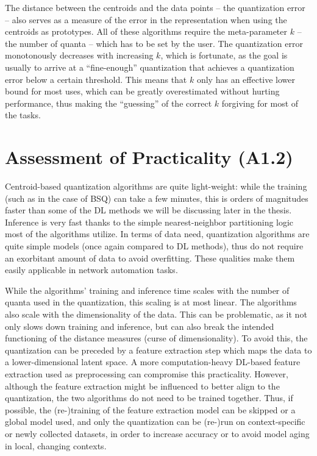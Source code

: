 		The distance between the centroids and the data points -- the quantization error -- also serves as a measure of the error in the representation when using the centroids as prototypes.
		All of these algorithms require the meta-parameter $k$ -- the number of quanta -- which has to be set by the user.
		The quantization error monotonously decreases with increasing $k$, which is fortunate, as the goal is usually to arrive at a ``fine-enough'' quantization that achieves a quantization error below a certain threshold.
		This means that $k$ only has an effective lower bound for most uses, which can be greatly overestimated without hurting performance, thus making the ``guessing'' of the correct $k$ forgiving for most of the tasks.
		
	\section{Assessment of Practicality (A1.2)}
		
		Centroid-based quantization algorithms are quite light-weight: while the training (such as in the case of \ac{BSQ}) can take a few minutes, this is orders of magnitudes faster than some of the \ac{DL} methods we will be discussing later in the thesis.
		Inference is very fast thanks to the simple nearest-neighbor partitioning logic most of the algorithms utilize.
		In terms of data need, quantization algorithms are quite simple models (once again compared to \ac{DL} methods), thus do not require an exorbitant amount of data to avoid overfitting.
		These qualities make them easily applicable in network automation tasks.
		
		While the algorithms' training and inference time scales with the number of quanta used in the quantization, this scaling is at most linear.		
		The algorithms also scale with the dimensionality of the data.
		This can be problematic, as it not only slows down training and inference, but can also break the intended functioning of the distance measures (curse of dimensionality).
		To avoid this, the quantization can be preceded by a feature extraction step which maps the data to a lower-dimensional latent space.
		A more computation-heavy \ac{DL}-based feature extraction used as preprocessing can compromise this practicality.
		However, although the feature extraction might be influenced to better align to the quantization, the two algorithms do not need to be trained together.
		Thus, if possible, the (re-)training of the feature extraction model can be skipped or a global model used, and only the quantization can be (re-)run on context-specific or newly collected datasets, in order to increase accuracy or to avoid model aging in local, changing contexts.	
		
